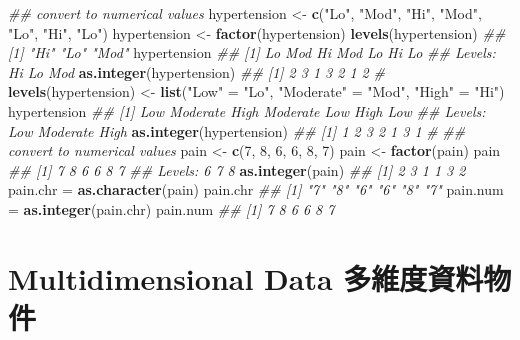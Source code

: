 \documentclass[
]{book}
\newenvironment{Shaded}{\begin{snugshade}}{\end{snugshade}}
\newcommand{\CommentTok}[1]{\textcolor[rgb]{0.56,0.35,0.01}{\textit{#1}}}
\newcommand{\DecValTok}[1]{\textcolor[rgb]{0.00,0.00,0.81}{#1}}
\newcommand{\KeywordTok}[1]{\textcolor[rgb]{0.13,0.29,0.53}{\textbf{#1}}}
\newcommand{\NormalTok}[1]{#1}
\newcommand{\StringTok}[1]{\textcolor[rgb]{0.31,0.60,0.02}{#1}}
\begin{document}
\begin{Shaded}
\begin{Highlighting}[]
\CommentTok{\#\# convert to numerical values}
\NormalTok{hypertension \textless{}{-}}\StringTok{ }\KeywordTok{c}\NormalTok{(}\StringTok{"Lo"}\NormalTok{, }\StringTok{"Mod"}\NormalTok{, }\StringTok{"Hi"}\NormalTok{, }\StringTok{"Mod"}\NormalTok{, }\StringTok{"Lo"}\NormalTok{, }\StringTok{"Hi"}\NormalTok{, }\StringTok{"Lo"}\NormalTok{)}
\NormalTok{hypertension \textless{}{-}}\StringTok{ }\KeywordTok{factor}\NormalTok{(hypertension)}
\KeywordTok{levels}\NormalTok{(hypertension)}
\CommentTok{\#\# [1] "Hi"  "Lo"  "Mod"}
\NormalTok{hypertension}
\CommentTok{\#\# [1] Lo  Mod Hi  Mod Lo  Hi  Lo }
\CommentTok{\#\# Levels: Hi Lo Mod}
\KeywordTok{as.integer}\NormalTok{(hypertension)}
\CommentTok{\#\# [1] 2 3 1 3 2 1 2}
\CommentTok{\#}
\KeywordTok{levels}\NormalTok{(hypertension) \textless{}{-}}\StringTok{ }\KeywordTok{list}\NormalTok{(}\StringTok{"Low"}\NormalTok{ =}\StringTok{ "Lo"}\NormalTok{, }
                             \StringTok{"Moderate"}\NormalTok{ =}\StringTok{ "Mod"}\NormalTok{, }
                             \StringTok{"High"}\NormalTok{ =}\StringTok{ "Hi"}\NormalTok{)}
\NormalTok{hypertension}
\CommentTok{\#\# [1] Low      Moderate High     Moderate Low      High     Low     }
\CommentTok{\#\# Levels: Low Moderate High}
\KeywordTok{as.integer}\NormalTok{(hypertension) }
\CommentTok{\#\# [1] 1 2 3 2 1 3 1}
\CommentTok{\#}
\CommentTok{\#\# convert to numerical values}
\NormalTok{pain \textless{}{-}}\StringTok{ }\KeywordTok{c}\NormalTok{(}\DecValTok{7}\NormalTok{, }\DecValTok{8}\NormalTok{, }\DecValTok{6}\NormalTok{, }\DecValTok{6}\NormalTok{, }\DecValTok{8}\NormalTok{, }\DecValTok{7}\NormalTok{)}
\NormalTok{pain \textless{}{-}}\StringTok{ }\KeywordTok{factor}\NormalTok{(pain)}
\NormalTok{pain}
\CommentTok{\#\# [1] 7 8 6 6 8 7}
\CommentTok{\#\# Levels: 6 7 8}
\KeywordTok{as.integer}\NormalTok{(pain)}
\CommentTok{\#\# [1] 2 3 1 1 3 2}
\NormalTok{pain.chr =}\StringTok{ }\KeywordTok{as.character}\NormalTok{(pain)}
\NormalTok{pain.chr}
\CommentTok{\#\# [1] "7" "8" "6" "6" "8" "7"}
\NormalTok{pain.num =}\StringTok{ }\KeywordTok{as.integer}\NormalTok{(pain.chr)}
\NormalTok{pain.num}
\CommentTok{\#\# [1] 7 8 6 6 8 7}
\end{Highlighting}
\end{Shaded}

\hypertarget{multidimensional-data-ux591aux7dadux5ea6ux8cc7ux6599ux7269ux4ef6}{%
\chapter{Multidimensional Data 多維度資料物件}\label{multidimensional-data-ux591aux7dadux5ea6ux8cc7ux6599ux7269ux4ef6}}
\end{document}
